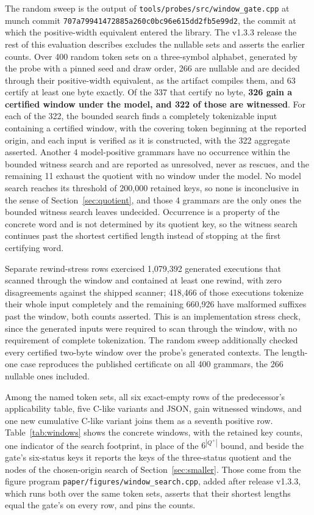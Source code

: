\documentclass[11pt,a4paper]{article}
\theoremstyle{definition}
\theoremstyle{plain}
\newcommand{\code}[1]{\texttt{#1}}
\begin{document}
The random sweep is the output of \code{tools/probes/src/window\_gate.cpp} at munch commit
\code{707a79941472885a260c0bc96e615dd2fb5e99d2}, the commit at which the positive-width equivalent entered the library.
The v1.3.3 release the rest of this evaluation describes excludes the nullable sets and asserts the earlier counts. Over
400 random token sets on a three-symbol alphabet, generated by the probe with a pinned seed and draw order, 266 are
nullable and are decided through their positive-width equivalent, as the artifact compiles them, and 63 certify at least
one byte exactly. Of the 337 that certify no byte,
\textbf{326 gain a certified window under the model, and 322 of those are witnessed}. For each of the 322, the bounded
search finds a completely tokenizable input containing a certified window, with the covering token beginning at the
reported origin, and each input is verified as it is constructed, with the 322 aggregate asserted. Another 4
model-positive grammars have no occurrence within the bounded witness search and are reported as unresolved, never as
rescues, and the remaining 11 exhaust the quotient with no window under the model. No model search reaches its threshold
of 200{,}000 retained keys, so none is inconclusive in the sense of Section~\ref{sec:quotient}, and those 4 grammars are
the only ones the bounded witness search leaves undecided. Occurrence is a property of the concrete word and is not
determined by its quotient key, so the witness search continues past the shortest certified length instead of stopping
at the first certifying word.

Separate rewind-stress rows exercised 1{,}079{,}392 generated executions that scanned through the window and contained
at least one rewind, with zero disagreements against the shipped scanner; 418{,}466 of those executions tokenize their
whole input completely and the remaining 660{,}926 have malformed suffixes past the window, both counts asserted. This
is an implementation stress check, since the generated inputs were required to scan through the window, with no
requirement of complete tokenization. The random sweep additionally checked every certified two-byte window over the
probe's generated contexts. The length-one case reproduces the published certificate on all 400 grammars, the 266
nullable ones included.

Among the named token sets, all six exact-empty rows of the predecessor's applicability table, five C-like variants and
JSON, gain witnessed windows, and one new cumulative C-like variant joins them as a seventh positive row.
Table~\ref{tab:windows} shows the concrete windows, with the retained key counts, one indicator of the search footprint,
in place of the $6^{|Q^+|}$ bound, and beside the gate's six-status keys it reports the keys of the three-status
quotient and the nodes of the chosen-origin search of Section~\ref{sec:smaller}. Those come from the figure program
\code{paper/figures/window\_search.cpp}, added after release v1.3.3, which runs both over the same token sets, asserts
that their shortest lengths equal the gate's on every row, and pins the counts.
\end{document}
